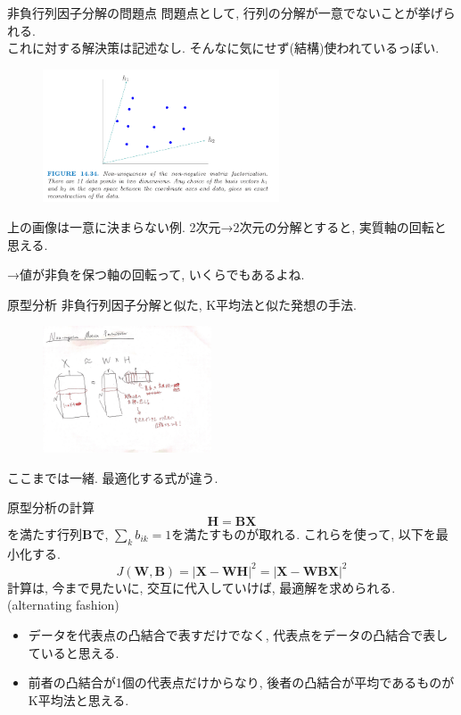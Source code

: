 \documentclass[dvipdfmx,8pt]{beamer}
\begin{document}
  \begin{frame}{非負行列因子分解の問題点}
    問題点として, 行列の分解が一意でないことが挙げられる. \\
    これに対する解決策は記述なし.
    そんなに気にせず(結構)使われているっぽい.
    \begin{figure}[htb]
      \centering
      \includegraphics[width=7cm,clip]{images/nnmf-nonuniqueness.png}
    \end{figure}
    上の画像は一意に決まらない例.
    2次元→2次元の分解とすると, 実質軸の回転と思える.

    →値が非負を保つ軸の回転って, いくらでもあるよね.
  \end{frame}
  \begin{frame}{原型分析}
    非負行列因子分解と似た, K平均法と似た発想の手法. \\
    \begin{figure}[htb]
      \centering
      \includegraphics[width=5cm,clip]{images/nmf-overview.jpg}
    \end{figure}
    ここまでは一緒. 最適化する式が違う.
  \end{frame}
  \begin{frame}{原型分析の計算}
    \[
      \mathbf{H}=\mathbf{BX}
    \]
    を満たす行列$\mathbf{B}$で, $\sum_k{b_{ik}}=1$を満たすものが取れる.
    これらを使って, 以下を最小化する.
    \[
      J(\mathbf{W},\mathbf{B})=|\mathbf{X}-\mathbf{WH}|^2=|\mathbf{X}-\mathbf{WBX}|^2
    \]
    計算は, 今まで見たいに, 交互に代入していけば, 最適解を求められる. (alternating fashion)
    \begin{itemize}
      \item データを代表点の凸結合で表すだけでなく, 代表点をデータの凸結合で表していると思える.
      \item 前者の凸結合が1個の代表点だけからなり, 後者の凸結合が平均であるものがK平均法と思える.
    \end{itemize}
  \end{frame}
\end{document}

